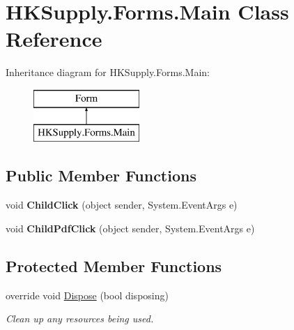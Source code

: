 \hypertarget{class_h_k_supply_1_1_forms_1_1_main}{}\section{H\+K\+Supply.\+Forms.\+Main Class Reference}
\label{class_h_k_supply_1_1_forms_1_1_main}
Inheritance diagram for H\+K\+Supply.\+Forms.\+Main\+:\begin{figure}[H]
\begin{center}
\leavevmode
\includegraphics[height=2.000000cm]{class_h_k_supply_1_1_forms_1_1_main}
\end{center}
\end{figure}
\subsection*{Public Member Functions}
\begin{DoxyCompactItemize}
\item 
\mbox{\label{class_h_k_supply_1_1_forms_1_1_main_ae322c78605a4993241d8cf837cc2e6fc}} 
void {\bfseries Child\+Click} (object sender, System.\+Event\+Args e)
\item 
\mbox{\label{class_h_k_supply_1_1_forms_1_1_main_addabcc6880d05211cf957130edb2bbe3}} 
void {\bfseries Child\+Pdf\+Click} (object sender, System.\+Event\+Args e)
\end{DoxyCompactItemize}
\subsection*{Protected Member Functions}
\begin{DoxyCompactItemize}
\item 
override void \mbox{\hyperlink{class_h_k_supply_1_1_forms_1_1_main_a99fe43d79c789818b37bb46db1dfa795}{Dispose}} (bool disposing)
\begin{DoxyCompactList}\small\item\em Clean up any resources being used. \end{DoxyCompactList}\end{DoxyCompactItemize}


